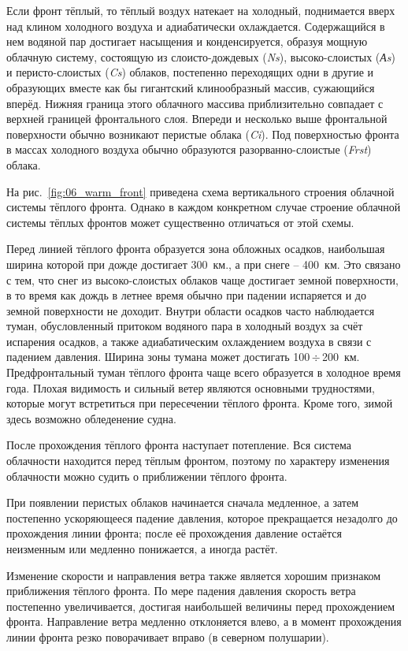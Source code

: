 \documentclass[a4paper, 12pt, twoside, final, book, russian, fittopage, cyremdash, openright]{ncc}
\newcommand{\otdo}{\,\ensuremath{\div}\,}
\begin{document}
Если фронт тёплый, то тёплый воздух натекает на холодный, поднимается
вверх над клином холодного воздуха и адиабатически
охлаждается. Содержащийся в нем водяной пар достигает насыщения и
конденсируется, образуя мощную облачную систему, состоящую из
слоисто-дождевых (\textit{Ns}), высоко-слоистых (\textit{Аs}) и
перисто-слоистых (\textit{Cs}) облаков, постепенно переходящих одни в
другие и образующих вместе как бы гигантский клинообразный массив,
сужающийся вперёд. Нижняя граница этого облачного массива
приблизительно совпадает с верхней границей фронтального слоя. Впереди
и несколько выше фронтальной поверхности обычно возникают перистые
облака (\textit{Ci}). Под поверхностью фронта в массах холодного
воздуха обычно образуются разорванно-слоистые (\textit{Frst}) облака.

На рис.~\ref{fig:06_warm_front} приведена схема вертикального строения
облачной системы тёплого фронта. Однако в каждом конкретном случае
строение облачной системы тёплых фронтов может существенно отличаться
от этой схемы.

Перед линией тёплого фронта образуется зона обложных
осадков, наибольшая ширина которой при
дожде достигает 300~км., а при снеге \--- 400~км. Это связано с тем,
что снег из высоко-слоистых облаков чаще достигает земной поверхности,
в то время как дождь в летнее время обычно при падении испаряется и до
земной поверхности не доходит. Внутри области осадков часто
наблюдается туман, обусловленный притоком водяного пара в холодный
воздух за счёт испарения осадков, а также адиабатическим охлаждением
воздуха в связи с падением давления. Ширина зоны тумана может
достигать 100\otdo{}200~км. Предфронтальный туман тёплого фронта чаще
всего образуется в холодное время года. Плохая видимость и сильный
ветер являются основными трудностями, которые могут встретиться при
пересечении тёплого фронта. Кроме того, зимой здесь возможно
обледенение судна.

После прохождения тёплого фронта наступает потепление. Вся система
облачности находится перед тёплым фронтом, поэтому по характеру
изменения облачности можно судить о приближении тёплого фронта.

При появлении перистых облаков начинается сначала медленное, а затем
постепенно ускоряющееся падение давления, которое прекращается
незадолго до прохождения линии фронта; после её прохождения давление
остаётся неизменным или медленно понижается, а иногда растёт.

Изменение скорости и направления ветра также является хорошим
признаком приближения тёплого фронта. По мере падения давления
скорость ветра постепенно увеличивается, достигая наибольшей величины
перед прохождением фронта. Направление ветра медленно отклоняется
влево, а в момент прохождения линии фронта резко поворачивает вправо
(в северном полушарии).
\end{document}
